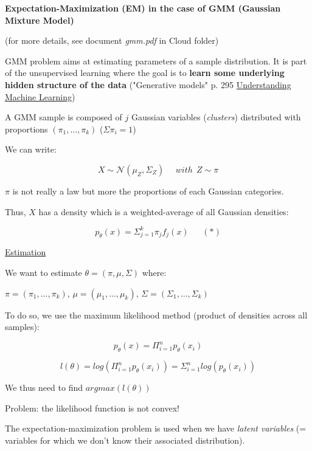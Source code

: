{\fontsize{12pt}{22pt} \textbf{Expectation-Maximization (EM) in the case of GMM (Gaussian Mixture Model)}\par}

\vspace{5mm}

(for more details, see document \textit{gmm.pdf} in Cloud folder)

\vspace{5mm}

GMM problem aims at estimating parameters of a sample distribution. It is part of the unsupervised learning where the goal is to \textbf{learn some underlying hidden structure of the data} ("Generative models" p. 295 \underline{Understanding Machine Learning})

\vspace{5mm}

A GMM sample is composed of $j$ Gaussian variables (\textit{clusters}) distributed with proportions $(\pi_1,...,\pi_k)$ ($\Sigma \pi_i =1$)

We can write:

$$X \sim \mathcal{N}(\mu_{Z},\Sigma_{Z})~~~~~~with~~Z \sim \pi$$

$\pi$ is not really a law but more the proportions of each Gaussian categories.

Thus, $X$ has a density which is a weighted-average of all Gaussian densities:

$$p_\theta(x) = \Sigma_{j=1}^{k}\pi_j f_j(x)~~~~~~~(*)$$


\underline{Estimation}

We want to estimate $\theta = (\pi, \mu, \Sigma)$ where:

$\pi=(\pi_1,...,\pi_k)$, $\mu=(\mu_1,...,\mu_k)$, $\Sigma=(\Sigma_1,...,\Sigma_k)$

\vspace{5mm}

To do so, we use the maximum likelihood method (product of densities across all samples):

$$p_\theta(x)=\Pi_{i=1}^n p_\theta(x_i)$$

$$l(\theta)=log(\Pi_{i=1}^n p_\theta(x_i))=\Sigma_{i=1}^n log(p_\theta(x_i))$$

We thus need to find $argmax(l(\theta))$

Problem: the likelihood function is not convex!

\vspace{5mm}

The expectation-maximization problem is used when we have \textit{latent variables} (= variables for which we don't know their associated distribution).


